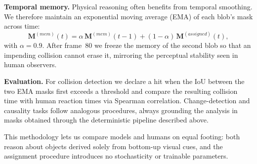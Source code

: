 \documentclass[letterpaper]{article} %
\begin{document}
\textbf{Temporal memory.}  Physical reasoning often benefits from temporal smoothing.  We therefore maintain an exponential moving average (EMA) of each blob’s mask across time:
\begin{equation}
\mathbf{M}^{(mem)}(t) = \alpha\,\mathbf{M}^{(mem)}(t-1) + (1-\alpha)\,\mathbf{M}^{(assigned)}(t),
\label{eq:ema}
\end{equation}
with $\alpha=0.9$.  After frame~80 we freeze the memory of the second blob so that an impending collision cannot erase it, mirroring the perceptual stability seen in human observers.

\textbf{Evaluation.}  For collision detection we declare a hit when the IoU between the two EMA masks first exceeds a threshold and compare the resulting collision time with human reaction times via Spearman correlation.  Change-detection and causality tasks follow analogous procedures, always grounding the analysis in masks obtained through the deterministic pipeline described above.

This methodology lets us compare models and humans on equal footing: both reason about objects derived solely from bottom-up visual cues, and the assignment procedure introduces no stochasticity or trainable parameters.


\end{document}

